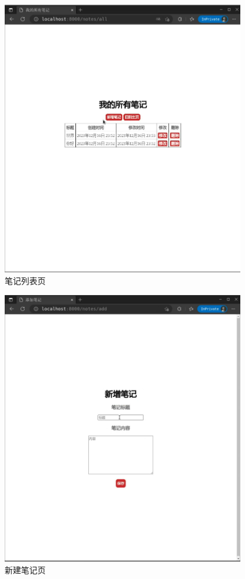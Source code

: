 \begin{figure}[H]
  \begin{center}
    \includegraphics[width=0.95\textwidth]{./figures/list_note_page.png}
  \end{center}
  \caption{笔记列表页}
\end{figure}

\begin{figure}[H]
  \begin{center}
    \includegraphics[width=0.95\textwidth]{./figures/add_note_page.png}
  \end{center}
  \caption{新建笔记页}
\end{figure}

